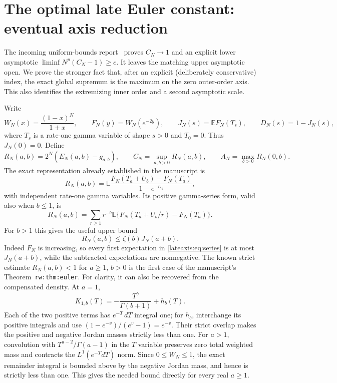
\section{The optimal late Euler constant: eventual axis reduction}
\label{lateaxis:sec:global}

The incoming uniform-bounds report~\cite{incoming-bounds} proves $C_N\to1$ and an explicit
lower asymptotic $\liminf N^p(C_N-1)\ge c$.  It leaves the matching
upper asymptotic open.  We prove the stronger fact that, after an
explicit (deliberately conservative) index, the exact global supremum
is the maximum on the zero outer-order axis.  This also identifies
the extremizing inner order and a second asymptotic scale.

Write
\[
 W_N(x)=\frac{(1-x)^N}{1+x},\qquad
 F_N(y)=W_N(e^{-2y}),\qquad
 J_N(s)=\mathbb E F_N(T_s),\qquad D_N(s)=1-J_N(s),
\]
where $T_s$ is a rate-one gamma variable of shape $s>0$ and $T_0=0$.
Thus $J_N(0)=0$.  Define
\[
 R_N(a,b)=2^N(E_N(a,b)-g_{a,b}),\qquad
 C_N=\sup_{a,b>0}R_N(a,b),\qquad
 A_N=\max_{b>0}R_N(0,b).
\]
The exact representation already established in the manuscript is
\begin{equation}\label{lateaxis:eq:kernel}
 R_N(a,b)=\mathbb E\frac{F_N(T_a+U_b)-F_N(T_a)}{1-e^{-U_b}},
\end{equation}
with independent rate-one gamma variables.  Its positive gamma-series
form, valid also when $b\le1$, is
\begin{equation}\label{lateaxis:eq:series}
 R_N(a,b)=\sum_{r\ge1}r^{-b}
 \mathbb E\{F_N(T_a+U_b/r)-F_N(T_a)\}.
\end{equation}
For $b>1$ this gives the useful upper bound
\begin{equation}\label{lateaxis:eq:zetaJ}
 R_N(a,b)\le\zeta(b)J_N(a+b).
\end{equation}
Indeed $F_N$ is increasing, so every first expectation in
\eqref{lateaxis:eq:series} is at most $J_N(a+b)$, while the subtracted
expectations are nonnegative.  The known strict estimate
$R_N(a,b)<1$ for $a\ge1$, $b>0$ is the first case of the manuscript's
Theorem~\texttt{rw:thm:euler}.  For clarity, it can also be recovered from the compensated density.
At $a=1$,
\[
 K_{1,b}(T)=-\frac{T^b}{\Gamma(b+1)}+h_b(T).
\]
Each of the two positive terms has $e^{-T}\,dT$ integral one;
for $h_b$, interchange its positive integrals and use
$(1-e^{-v})/(e^v-1)=e^{-v}$. Their strict overlap makes the positive
and negative Jordan masses strictly less than one. For $a>1$,
convolution with $T^{a-2}/\Gamma(a-1)$ in the $T$ variable preserves
zero total weighted mass and contracts the $L^1(e^{-T}dT)$ norm.
Since $0\le W_N\le1$, the exact remainder integral is bounded above
by the negative Jordan mass, and hence is strictly less than one.
This gives the needed bound directly for every real $a\ge1$.

